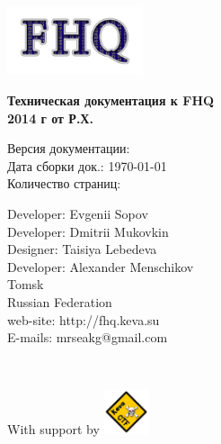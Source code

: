 \begin{titlepage}

\noindent
\begin{flushright}
\includegraphics[width=0.3\textwidth]{./img/logo}~
\\[3cm]

\end{flushright}
\begin{center}
{ \huge \bfseries Техническая документация к FHQ \\ 2014 г от Р.Х.\\[2cm] }
\end{center}

\noindent
\begin{minipage}{0.4\textwidth}
\begin{flushleft}
Версия документации:  \\
Дата сборки док.: \today \\
Количество страниц: \pageref{LastPage} \\
\end{flushleft}
\end{minipage}%

\vfill


\noindent
\begin{minipage}{0.5\textwidth}
\begin{flushleft}
Developer: Evgenii Sopov \\
Developer: Dmitrii Mukovkin \\
Designer: Taisiya Lebedeva \\
Developer: Alexander Menschikov \\
Tomsk \\
Russian Federation \\[0.4cm]
web-site: http://fhq.keva.su \\
E-mails: mrseakg@gmail.com
\end{flushleft}
\end{minipage}%
\\[1cm]

\noindent

\begin{minipage}{1.0\textwidth}
\begin{flushright}
With support by
\includegraphics[width=0.1\textwidth]{./img/keva}~
\end{flushright}
\end{minipage}%


\end{titlepage}
